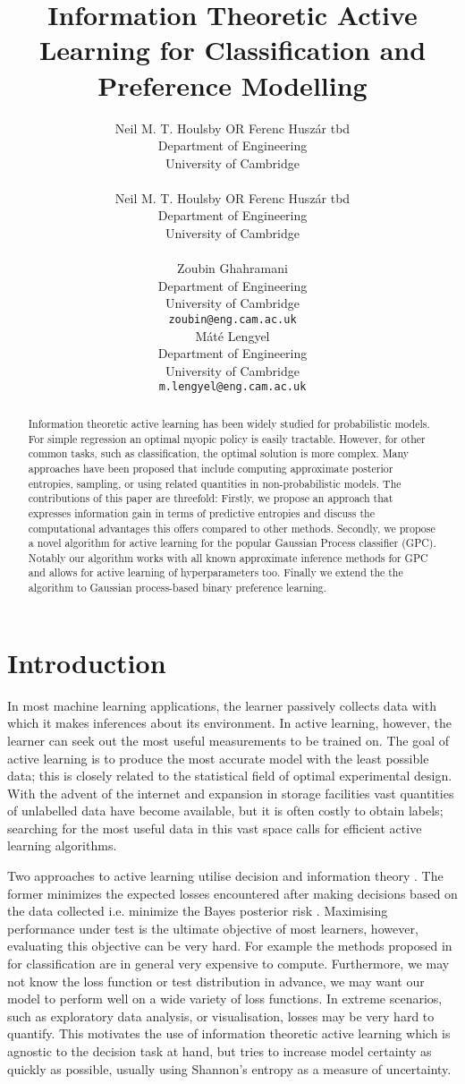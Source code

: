 \documentclass{article}
\title{Information Theoretic Active Learning for Classification and Preference Modelling}
\author{
Neil M. T. Houlsby OR Ferenc Husz\'{a}r tbd\\
Department of Engineering\\
University of Cambridge\\
\texttt{} \\
\And
Neil M. T. Houlsby OR Ferenc Husz\'{a}r tbd\\
Department of Engineering\\
University of Cambridge\\
\texttt{} \\
\AND
Zoubin Ghahramani\\
Department of Engineering\\
University of Cambridge\\
\texttt{zoubin@eng.cam.ac.uk} \\
\And
M\'{a}t\'{e} Lengyel\\
Department of Engineering\\
University of Cambridge\\
\texttt{m.lengyel@eng.cam.ac.uk} \\
}
\begin{document}
\maketitle

\begin{abstract}

Information theoretic active learning has been widely studied for probabilistic models. For simple regression an optimal myopic policy is easily tractable. However, for other common tasks, such as classification, the optimal solution is more complex. Many approaches have been proposed that include computing approximate posterior entropies, sampling, or using related quantities in non-probabilistic models. The contributions of this paper are threefold: Firstly, we propose an approach that expresses information gain in terms of predictive entropies and discuss the computational advantages this offers compared to other methods. Secondly, we propose a novel algorithm for active learning for the popular Gaussian Process classifier (GPC). Notably our algorithm works with all known approximate inference methods for GPC and allows for active learning of hyperparameters too. Finally we extend the the algorithm to Gaussian process-based binary preference learning.

\end{abstract}

\section{Introduction}
In most machine learning applications, the learner passively collects data with which it makes inferences about its environment. In active learning, however, the learner can seek out the most useful measurements to be trained on. The goal of active learning is to produce the most accurate model with the least possible data; this is closely related to the statistical field of optimal experimental design. With the advent of the internet and expansion in storage facilities vast quantities of unlabelled data have become available, but it is often costly to obtain labels; searching for the most useful data in this vast space calls for efficient active learning algorithms.

Two approaches to active learning utilise decision and information theory \cite{kapoor2007,lindley1956}. The former minimizes the expected losses encountered after making decisions based on the data collected i.e. minimize the Bayes posterior risk \cite{roy2001}. Maximising performance under test is the ultimate objective of most learners, however, evaluating this objective can be very hard. For example the methods proposed in \cite{kapoor2007,zhu2003} for classification are in general very expensive to compute. Furthermore, we may not know the loss function or test distribution in advance, we may want our model to perform well on a wide variety of loss functions. In extreme scenarios, such as exploratory data analysis, or visualisation, losses may be very hard to quantify. This motivates the use of information theoretic active learning which is agnostic to the decision task at hand, but tries to increase model certainty as quickly as possible, usually using Shannon's entropy as a measure of uncertainty. 
\end{document}
